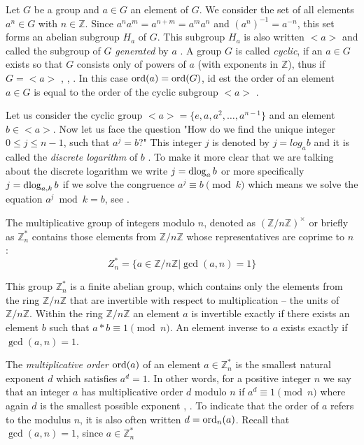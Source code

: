Let $G$ be a group and $a\in G$ an element of $G$. We consider the set of all elements $a^n\in G$ with $n\in\mathbb{Z}$. Since $a^na^m=a^{n+m}=a^ma^n$ and $(a^n)^{-1}=a^{-n}$, this set forms an abelian subgroup $H_a$ of $G$. This subgroup $H_a$ is also written $<a>$ and called the subgroup of $G$ \textit{generated} by $a$ \cite[p.~50]{Ref_Forster_2015}. A group $G$ is called \textit{cyclic}, if an $a\in G$ exists so that $G$ consists only of powers of $a$ (with exponents in $\mathbb{Z}$), thus if $G=<a>$ \cite[p.~34]{Ref_Wolfart_2011}, \cite[p.~50]{Ref_Forster_2015}, \cite[p.~240]{Ref_Modler_Kreh_2012}. In this case $\operatorname{ord}(a)=\operatorname{ord}(G)$, id est the order of an element $a\in G$ is equal to the order of the cyclic subgroup $<a>$ \cite[p.~50]{Ref_Forster_2015}.

Let us consider the cyclic group $<a>=\{e,a,a^2,\ldots,a^{n-1}\}$ and an element $b\in<a>$. Now let us face the question "How do we find the unique integer $0\le j\le n-1$, such that $a^j=b$?" This integer $j$ is denoted by $j=log_ab$ and it is called the \textit{discrete logarithm} of $b$ \cite[p.~255-256]{Ref_Stinson_Paterson_2019}. To make it more clear that we are talking about the discrete logarithm we write $j=\operatorname{dlog}_ab$ or more specifically $j=\operatorname{dlog}_{a,k}b$ if we solve the congruence $a^j\equiv b\pmod k$ which means we solve the equation $a^j\bmod k=b$, see \cite{Ref_Jain_2011}.

The multiplicative group of integers modulo $n$, denoted as $(\mathbb{Z}/n\mathbb{Z})^\times$ or briefly as $\mathbb{Z}_n^\ast$ contains those elements from $\mathbb{Z}/n\mathbb{Z}$ whose representatives are coprime to $n$ \cite[p.~87]{Ref_Teschl_2013}:
\begin{equation}
\label{eq:multiplicative_group_mod_n}
Z_n^\ast=\{a\in\mathbb{Z}/n\mathbb{Z}|\gcd(a,n)=1\}
\end{equation}

This group $\mathbb{Z}_n^\ast$ is a finite abelian group, which contains only the elements from the ring $\mathbb{Z}/n\mathbb{Z}$ that are invertible with respect to multiplication -- the units of $\mathbb{Z}/n\mathbb{Z}$. Within the ring $\mathbb{Z}/n\mathbb{Z}$ an element $a$ is invertible exactly if there exists an element $b$ such that $a*b\equiv1\pmod n$. An element inverse to $a$ exists exactly if $\gcd(a,n)=1$.

The \textit{multiplicative order} $\operatorname{ord}(a)$ of an element $a\in\mathbb{Z}_n^\ast$ is the smallest natural exponent $d$ which satisfies $a^d=1$. In other words, for a positive integer $n$ we say that an integer $a$ has multiplicative order $d$ modulo $n$ if $a^d\equiv1\pmod n$ where again $d$ is the smallest possible exponent \cite[p.~76]{Ref_Hutz_2018}, \cite[p.~32]{Ref_Shoup_2008}. To indicate that the order of $a$ refers to the modulus $n$, it is also often written $d=\operatorname{ord}_n(a)$. Recall that $\gcd(a,n)=1$, since $a\in\mathbb{Z}_n^\ast$

